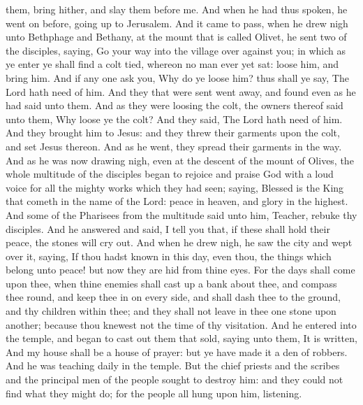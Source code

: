 them, bring hither, and slay them before me.  And when he had thus spoken, he went on before, going up to Jerusalem.  And it came to pass, when he drew nigh unto Bethphage and Bethany, at the mount that is called Olivet, he sent two of the disciples, saying, Go your way into the village over against you; in which as ye enter ye shall find a colt tied, whereon no man ever yet sat: loose him, and bring him. And if any one ask you, Why do ye loose him? thus shall ye say, The Lord hath need of him. And they that were sent went away, and found even as he had said unto them. And as they were loosing the colt, the owners thereof said unto them, Why loose ye the colt? And they said, The Lord hath need of him. And they brought him to Jesus: and they threw their garments upon the colt, and set Jesus thereon. And as he went, they spread their garments in the way. And as he was now drawing nigh, even at the descent of the mount of Olives, the whole multitude of the disciples began to rejoice and praise God with a loud voice for all the mighty works which they had seen; saying, Blessed is the King that cometh in the name of the Lord: peace in heaven, and glory in the highest. And some of the Pharisees from the multitude said unto him, Teacher, rebuke thy disciples. And he answered and said, I tell you that, if these shall hold their peace, the stones will cry out.  And when he drew nigh, he saw the city and wept over it, saying, If thou hadst known in this day, even thou, the things which belong unto peace! but now they are hid from thine eyes. For the days shall come upon thee, when thine enemies shall cast up a bank about thee, and compass thee round, and keep thee in on every side, and shall dash thee to the ground, and thy children within thee; and they shall not leave in thee one stone upon another; because thou knewest not the time of thy visitation.  And he entered into the temple, and began to cast out them that sold, saying unto them, It is written, And my house shall be a house of prayer: but ye have made it a den of robbers.  And he was teaching daily in the temple. But the chief priests and the scribes and the principal men of the people sought to destroy him: and they could not find what they might do; for the people all hung upon him, listening. 

